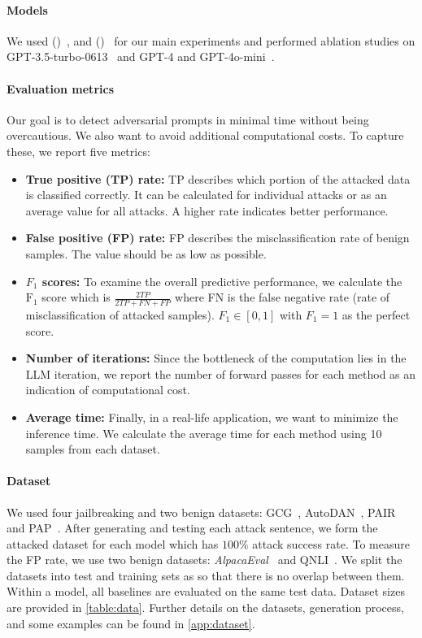 \paragraph{Models} We used  \llama{} (\llamachat{})~\citep{touvron2023llama}, and \vicuna{}  (\vicunathirteen{})~\citep{chiang2023vicuna}
for our main experiments and performed ablation studies on GPT-3.5-turbo-0613~\citep{brown2020language} and GPT-4 and GPT-4o-mini~\citep{gpt4}.

\paragraph{Evaluation metrics} Our goal is to detect adversarial prompts in minimal time without being overcautious. We also want to avoid additional computational costs. To capture these, we report five metrics:
\begin{itemize}
    \item \textbf{True positive (TP) rate:} TP describes which portion of the attacked data is classified correctly. It can be calculated for individual attacks or as an average value for all attacks. A higher rate indicates better performance.
    \item \textbf{False positive (FP) rate:} FP describes the misclassification rate of benign samples. The value should be as low as possible.
    \item \textbf{$F_1$ scores:} To examine the overall predictive performance, we calculate the $\text{F}_1$ score which is $\frac{2TP}{2TP +FN + FP }$ where FN is the false negative rate (rate of misclassification of attacked samples). $F_1 \in \left[0,1\right]$ with $F_1=1$ as the perfect score.
    \item \textbf{Number of iterations:} Since the bottleneck of the computation lies in the LLM iteration, we report the number of forward passes for each method as an indication of computational cost. 
    \item \textbf{Average time:} Finally, in a real-life application, we want to minimize the inference time. We calculate the average time for each method using 10 samples from each dataset.
\end{itemize}

\paragraph{Dataset} We used four jailbreaking and two benign datasets: GCG~\citep{zou2023universal}, AutoDAN~\citep{liu2023autodan}, PAIR~\citep{chao2023jailbreaking} and PAP~\citep{zeng2024johnny}. After generating and testing each attack sentence, we form the attacked dataset for each model which has $100\%$ attack success rate. To measure the FP rate, we use two benign datasets: \textit{AlpacaEval}~\citep{dubois2024alpacafarm} and QNLI~\citep{wang-etal-2018-glue}. We split the datasets into test and training sets as so that there is no overlap between them. Within a model, all baselines are evaluated on the same test data. Dataset sizes are provided in \cref{table:data}. Further details on the datasets, generation process, and some examples can be found in \cref{app:dataset}.

